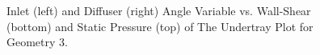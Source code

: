 \begin{figure}
    \noindent{}
    \caption{Inlet (left) and Diffuser (right) Angle Variable vs. Wall-Shear (bottom) and Static Pressure (top) of The Undertray Plot for Geometry 3.}
    \label{fig:2D_OF_A3_PLOT}
\end{figure}

